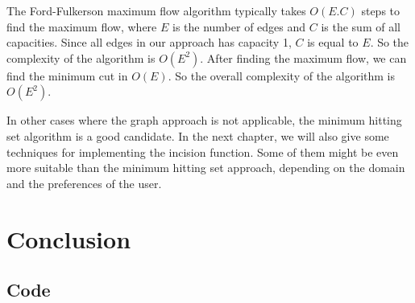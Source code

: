 \documentclass{sfuthesis}
\theoremstyle{plain}
\theoremstyle{definition}
\begin{document}
The Ford-Fulkerson maximum flow algorithm typically takes $O(E.C)$ steps to find the maximum flow, where $E$ is the number of edges and $C$ is the sum of all capacities. Since all edges in our approach has capacity 1, $C$ is equal to $E$. So the complexity of the algorithm is $O(E^2)$. After finding the maximum flow, we can find the minimum cut in $O(E)$. So the overall complexity of the algorithm is $O(E^2)$.

In other cases where the graph approach is not applicable, the minimum hitting set algorithm is a good candidate. In the next chapter, we will also give some techniques for implementing the incision function. Some of them might be even more suitable than the minimum hitting set approach, depending on the domain and the preferences of the user.





\chapter{Conclusion}




%
%
%
%
%

\backmatter%
	
	

\begin{appendices} %
	\chapter{Code}
\end{appendices}
\end{document}
